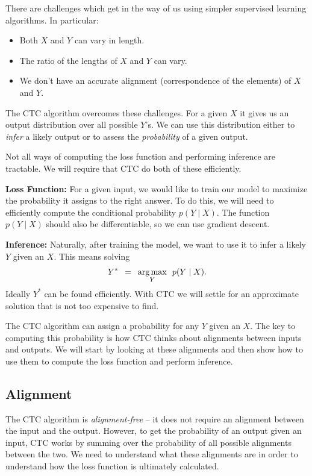 There are challenges which get in the way of us using simpler supervised
learning algorithms. In particular:
\begin{itemize}
  \item Both $X$ and $Y$ can vary in length.
  \item The ratio of the lengths of $X$ and $Y$ can vary.
  \item We don't have an accurate alignment (correspondence of the elements) of
  $X$ and $Y$.
\end{itemize}

The CTC algorithm overcomes these challenges. For a given $X$ it gives us an
output distribution over all possible $Y$'s. We can use this distribution
either to {\it infer} a likely output or to assess the {\it probability} of a
given output.

Not all ways of computing the loss function and performing inference are
tractable. We will require that CTC do both of these efficiently.

{\bf Loss Function:} For a given input, we would like to train our model to
maximize the probability it assigns to the right answer. To do this, we will
need to efficiently compute the conditional probability $p(Y \mid X)$. The
function $p(Y \mid X)$ should also be differentiable, so we can use gradient
descent.

{\bf Inference:} Naturally, after training the model, we want to use it to
infer a likely $Y$ given an $X$.  This means solving
\[
  Y^* \enspace =\enspace \operatorname*{arg\,max}_Y \enspace p(Y \mid X).
\]
Ideally $Y^*$ can be found efficiently. With CTC we will settle for an
approximate solution that is not too expensive to find.

The CTC algorithm can assign a probability for any $Y$ given an $X$. The key to
computing this probability is how CTC thinks about alignments between inputs
and outputs. We will start by looking at these alignments and then show how to
use them to compute the loss function and perform inference.

\subsection{Alignment}

The CTC algorithm is {\it alignment-free} -- it does not require an alignment
between the input and the output. However, to get the probability of an output
given an input, CTC works by summing over the probability of all possible
alignments between the two. We need to understand what these alignments are in
order to understand how the loss function is ultimately calculated.


